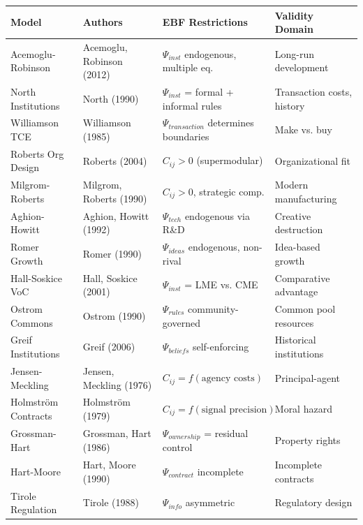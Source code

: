 \small
\begin{longtable}{@{}p{3cm}p{2.5cm}p{4cm}p{4cm}@{}}
\toprule
\textbf{Model} & \textbf{Authors} & \textbf{EBF Restrictions} & \textbf{Validity Domain} \\
\midrule
\endhead

Acemoglu-Robinson & Acemoglu, Robinson (2012) &
$\Psi_{inst}$ endogenous, multiple eq. &
Long-run development \\

North Institutions & North (1990) &
$\Psi_{inst}$ = formal + informal rules &
Transaction costs, history \\

Williamson TCE & Williamson (1985) &
$\Psi_{transaction}$ determines boundaries &
Make vs. buy \\

Roberts Org Design & Roberts (2004) &
$C_{ij} > 0$ (supermodular) &
Organizational fit \\

Milgrom-Roberts & Milgrom, Roberts (1990) &
$C_{ij} > 0$, strategic comp. &
Modern manufacturing \\

Aghion-Howitt & Aghion, Howitt (1992) &
$\Psi_{tech}$ endogenous via R\&D &
Creative destruction \\

Romer Growth & Romer (1990) &
$\Psi_{ideas}$ endogenous, non-rival &
Idea-based growth \\

Hall-Soskice VoC & Hall, Soskice (2001) &
$\Psi_{inst}$ = LME vs. CME &
Comparative advantage \\

Ostrom Commons & Ostrom (1990) &
$\Psi_{rules}$ community-governed &
Common pool resources \\

Greif Institutions & Greif (2006) &
$\Psi_{beliefs}$ self-enforcing &
Historical institutions \\

Jensen-Meckling & Jensen, Meckling (1976) &
$C_{ij} = f(\text{agency costs})$ &
Principal-agent \\

Holmström Contracts & Holmström (1979) &
$C_{ij} = f(\text{signal precision})$ &
Moral hazard \\

Grossman-Hart & Grossman, Hart (1986) &
$\Psi_{ownership}$ = residual control &
Property rights \\

Hart-Moore & Hart, Moore (1990) &
$\Psi_{contract}$ incomplete &
Incomplete contracts \\

Tirole Regulation & Tirole (1988) &
$\Psi_{info}$ asymmetric &
Regulatory design \\

\bottomrule
\end{longtable}
\normalsize

